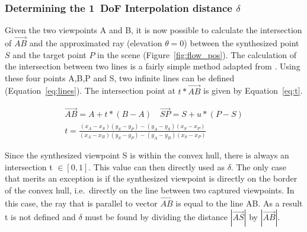 \subsubsection{Determining the 1~DoF Interpolation distance $\delta$}
Given the two viewpoints A and B, it is now possible to calculate the intersection of $\overrightarrow{AB}$ and the approximated ray (elevation $\theta = 0$) between the synthesized point $S$ and the target point $P$ in the scene (Figure~\ref{fig:flow_pos}). The calculation of the intersection between two lines is a fairly simple method adapted from \cite{lineline}. Using these four points A,B,P and S, two infinite lines can be defined (Equation~\ref{eq:lines}). The intersection point at $t * \overrightarrow{AB}$ is given by Equation~\ref{eq:t}.

\begin{align}
  \overrightarrow{AB} = A + t * (B-A) \quad \overrightarrow{SP} = S + u * (P-S) \label{eq:lines} \\
  t = \frac{(x_A - x_S)(y_S - y_P) - (y_A - y_S)(x_S - x_P)}{(x_A - x_B)(y_S - y_P) - (y_A - y_B)(x_S - x_P)} \label{eq:t}
\end{align}

Since the synthesized viewpoint S is within the convex hull, there is always an intersection t $\in [0,1]$. This value can then directly used as $\delta$. The only case that merits an exception is if the synthesized viewpoint is directly on the border of the convex hull, i.e.\ directly on the line between two captured viewpoints. In this case, the ray that is parallel to vector $\overrightarrow{AB}$ is equal to the line AB. As a result t is not defined and $\delta$ must be found by dividing the distance $|\overrightarrow{AS}|$ by $|\overrightarrow{AB}|$.

